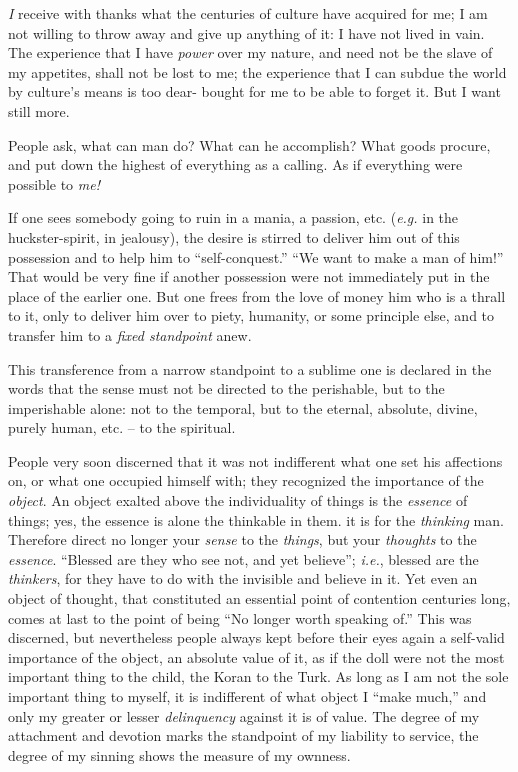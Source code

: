 \documentclass[12pt,a4paper]{book}
\begin{document}
\textit{I} receive with thanks what the centuries of culture have acquired for 
me; I am not willing to throw away and give up anything of it: I have not 
lived in vain. The experience that I have \textit{power} over my nature, and 
need not be the slave of my appetites, shall not be lost to me; the experience 
that I can subdue the world by culture's means is too dear- bought for me to 
be able to forget it. But I want still more.

People ask, what can man do? What can he accomplish? What goods procure, and 
put down the highest of everything as a calling. As if everything were 
possible to \textit{me!}

If one sees somebody going to ruin in a mania, a passion, etc. (\textit{e.g.} 
in the huckster-spirit, in jealousy), the desire is stirred to deliver him out 
of this possession and to help him to ``self-conquest.'' ``We want to make 
a man of him!'' That would be very fine if another possession were not 
immediately put in the place of the earlier one. But one frees from the love 
of money him who is a thrall to it, only to deliver him over to piety, 
humanity, or some principle else, and to transfer him to a \textit{fixed 
standpoint} anew.

This transference from a narrow standpoint to a sublime one is declared in the 
words that the sense must not be directed to the perishable, but to the 
imperishable alone: not to the temporal, but to the eternal, absolute, divine, 
purely human, etc. -- to the spiritual.

People very soon discerned that it was not indifferent what one set his 
affections on, or what one occupied himself with; they recognized the 
importance of the \textit{object}. An object exalted above the individuality 
of things is the \textit{essence} of things; yes, the essence is alone the 
thinkable in them. it is for the \textit{thinking} man. Therefore direct no 
longer your \textit{sense} to the \textit{things}, but your \textit{thoughts} 
to the \textit{essence}. ``Blessed are they who see not, and yet believe''; 
\textit{i.e.}, blessed are the \textit{thinkers}, for they have to do with 
the invisible and believe in it. Yet even an object of thought, that 
constituted an essential point of contention centuries long, comes at last to 
the point of being ``No longer worth speaking of.'' This was discerned, but 
nevertheless people always kept before their eyes again a self-valid 
importance of the object, an absolute value of it, as if the doll were not the 
most important thing to the child, the Koran to the Turk. As long as I am not 
the sole important thing to myself, it is indifferent of what object I ``make 
much,'' and only my greater or lesser \textit{delinquency} against it is of 
value. The degree of my attachment and devotion marks the standpoint of my 
liability to service, the degree of my sinning shows the measure of my 
ownness.
\end{document}
